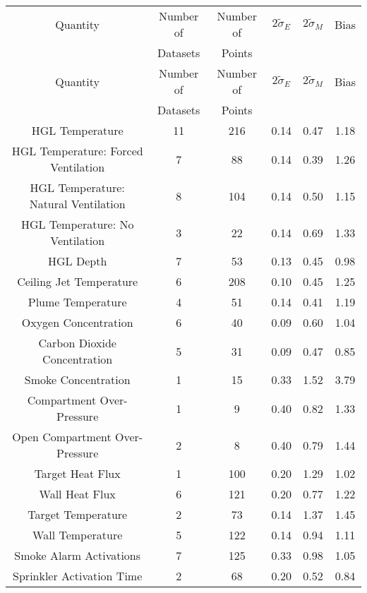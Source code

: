 \begin{center}
\begin{longtable}{|c|c|c|c|c|c|}
\hline
Quantity & Number of & Number of & $2\widetilde{\sigma}_E$ & $2\widetilde{\sigma}_M$ & Bias \\
         & Datasets  & Points    &                         &                         &      \\ \hline \hline
\endfirsthead
\hline
Quantity & Number of & Number of & $2\widetilde{\sigma}_E$ & $2\widetilde{\sigma}_M$ & Bias \\
         & Datasets  & Points    &                         &                         &      \\ \hline \hline
\endhead
HGL Temperature & 11 & 216 & 0.14 & 0.47 & 1.18 \\ \hline
HGL Temperature: Forced Ventilation & 7 & 88 & 0.14 & 0.39 & 1.26 \\ \hline
HGL Temperature: Natural Ventilation & 8 & 104 & 0.14 & 0.50 & 1.15 \\ \hline
HGL Temperature: No Ventilation & 3 & 22 & 0.14 & 0.69 & 1.33 \\ \hline
HGL Depth & 7 & 53 & 0.13 & 0.45 & 0.98 \\ \hline
Ceiling Jet Temperature & 6 & 208 & 0.10 & 0.45 & 1.25 \\ \hline
Plume Temperature & 4 & 51 & 0.14 & 0.41 & 1.19 \\ \hline
Oxygen Concentration & 6 & 40 & 0.09 & 0.60 & 1.04 \\ \hline
Carbon Dioxide Concentration & 5 & 31 & 0.09 & 0.47 & 0.85 \\ \hline
Smoke Concentration & 1 & 15 & 0.33 & 1.52 & 3.79 \\ \hline
Compartment Over-Pressure & 1 & 9 & 0.40 & 0.82 & 1.33 \\ \hline
Open Compartment Over-Pressure & 2 & 8 & 0.40 & 0.79 & 1.44 \\ \hline
Target Heat Flux & 1 & 100 & 0.20 & 1.29 & 1.02 \\ \hline
Wall Heat Flux & 6 & 121 & 0.20 & 0.77 & 1.22 \\ \hline
Target Temperature & 2 & 73 & 0.14 & 1.37 & 1.45 \\ \hline
Wall Temperature & 5 & 122 & 0.14 & 0.94 & 1.11 \\ \hline
Smoke Alarm Activations & 7 & 125 & 0.33 & 0.98 & 1.05 \\ \hline
Sprinkler Activation Time & 2 & 68 & 0.20 & 0.52 & 0.84 \\ \hline
\end{longtable}
\end{center}
